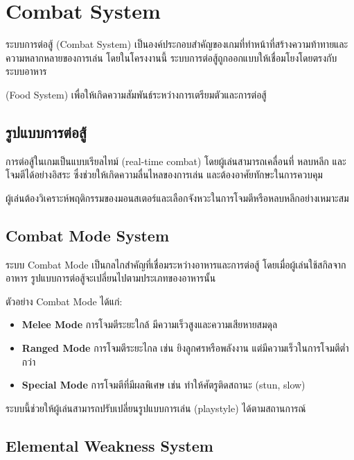 \section{Combat System}

ระบบการต่อสู้ (Combat System) เป็นองค์ประกอบสำคัญของเกมที่ทำหน้าที่สร้างความท้าทายและความหลากหลายของการเล่น โดยในโครงงานนี้ ระบบการต่อสู้ถูกออกแบบให้เชื่อมโยงโดยตรงกับระบบอาหาร 
\par\vspace{0.5em}\noindent
(Food System) เพื่อให้เกิดความสัมพันธ์ระหว่างการเตรียมตัวและการต่อสู้

\subsection{รูปแบบการต่อสู้}

การต่อสู้ในเกมเป็นแบบเรียลไทม์ (real-time combat) โดยผู้เล่นสามารถเคลื่อนที่ หลบหลีก และโจมตีได้อย่างอิสระ ซึ่งช่วยให้เกิดความลื่นไหลของการเล่น และต้องอาศัยทักษะในการควบคุม
\par\vspace{0.5em}\noindent
ผู้เล่นต้องวิเคราะห์พฤติกรรมของมอนสเตอร์และเลือกจังหวะในการโจมตีหรือหลบหลีกอย่างเหมาะสม

\subsection{Combat Mode System}

ระบบ Combat Mode เป็นกลไกสำคัญที่เชื่อมระหว่างอาหารและการต่อสู้ โดยเมื่อผู้เล่นใช้สกิลจากอาหาร รูปแบบการต่อสู้จะเปลี่ยนไปตามประเภทของอาหารนั้น

ตัวอย่าง Combat Mode ได้แก่:

\begin{itemize}
\item \textbf{Melee Mode}  
การโจมตีระยะใกล้ มีความเร็วสูงและความเสียหายสมดุล

\item \textbf{Ranged Mode}  
การโจมตีระยะไกล เช่น ยิงลูกศรหรือพลังงาน แต่มีความเร็วในการโจมตีต่ำกว่า

\item \textbf{Special Mode}  
การโจมตีที่มีผลพิเศษ เช่น ทำให้ศัตรูติดสถานะ (stun, slow)
\end{itemize}

ระบบนี้ช่วยให้ผู้เล่นสามารถปรับเปลี่ยนรูปแบบการเล่น (playstyle) ได้ตามสถานการณ์

\subsection{Elemental Weakness System}

